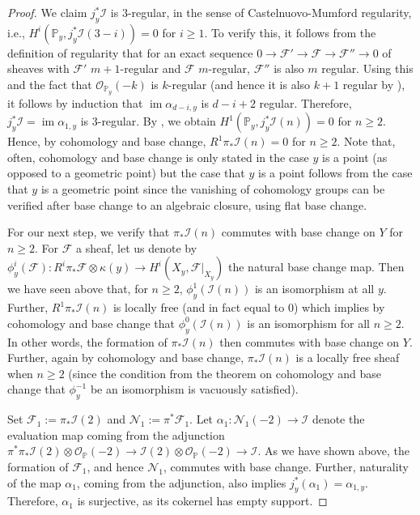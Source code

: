 \documentclass[12 pt]{amsart}
\newcommand{\rboxed}[1]{#1}
\theoremstyle{plain}
\theoremstyle{definition}
\theoremstyle{remark}
\numberwithin{equation}{section}
\newcommand\bp{\mathbb P}
\newcommand\scf{\mathscr F}
\newcommand\sci{\mathscr I}
\newcommand\scn{\mathscr N}
\newcommand\sco{\mathscr O}
\newcommand \ra{\rightarrow}
\DeclareMathOperator\im{im}
\begin{document}
\begin{proof}
	We claim
			$j_y^* \sci$ is $3$-regular, in the sense of
			Castelnuovo-Mumford regularity, i.e., $H^i( \bp_y, j_y^*
			\sci(3-i)) = 0$ for $i \geq 1$.  To verify this, it
			follows from the definition of regularity that for an
			exact sequence $0 \ra \scf' \ra \scf \ra \scf'' \ra 0$
			of sheaves with $\scf'$ $m+1$-regular and $\scf$
			$m$-regular, $\scf''$ is also $m$ regular.  Using this
			and the fact that $\sco_{\bp_y}(-k)$ is $k$-regular (and
			hence it is also $k+1$ regular by \cite[Lem.\
		5.1(b)]{FantechiGIK:fundamentalAlgebraicGeometry}), it follows
		by induction that $\im \alpha_{d-i,y}$ is $d-i+2$ regular.
		Therefore, $j^*_y \sci= \im \alpha_{1,y}$ is $3$-regular.  By
		\cite[Lem.\ 5.1(b)]{FantechiGIK:fundamentalAlgebraicGeometry},
		we obtain $H^1(\bp_y, j_y^* \sci(n)) = 0$ for $n \geq 2$.
		Hence, by cohomology and base change, $R^1 \pi_* \sci(n) = 0$
		for $n \geq 2$. Note that, often, cohomology and base change is
		only stated in the case $y$ is a point (as opposed to a
		geometric point) but the case that $y$ is a point follows from
		the case that $y$ is a geometric point since the vanishing of
		cohomology groups can be verified after base change to an
		algebraic closure, using flat base change.

	For our next step, we verify that $\pi_* \mathscr I(n)$ commutes with base
	change on $Y$ for $n \geq 2$.
	For $\scf$ a sheaf, let us denote by $\rboxed{\phi^i_y(\scf)} : R^i
	\pi_* \scf \otimes \kappa(y) \ra H^i(X_y, \scf|_{X_y})$ the natural base
	change map.  Then we have
	seen above that, for $n \geq 2$, $\phi^1_y(\sci(n))$ is an isomorphism
	at all $y$. Further, $R^1 \pi_* \sci(n)$ is locally free (and in fact
	equal to $0$) which implies by cohomology and base change that
	$\phi^0_y(\sci(n))$ is an isomorphism for all $n \geq 2$.  In other
	words, the formation of $\pi_* \sci(n)$ then commutes with base change
	on $Y$.  Further, again by cohomology and base change, $\pi_* \sci(n)$
	is a locally free sheaf when $n \geq 2$ (since the condition from the
		theorem on cohomology and base change that
	$\phi^{-1}_y$ be an isomorphism is vacuously satisfied).
			
	Set $\rboxed{\scf_1} := \pi_* \sci(2)$ and $\scn_1 := \pi^* \scf_1$.
	Let $\rboxed{\alpha_1} : \scn_1(-2) \ra \sci$ denote the evaluation map
	coming from the adjunction $\pi^* \pi_* \sci(2) \otimes \sco_\bp(-2) \ra
	\sci(2) \otimes \sco_{\bp}(-2) \ra \sci$.  As we have shown above, the
	formation of $\scf_1$, and hence $\scn_1$, commutes with base change.
	Further, naturality of the map $\alpha_1$, coming from the adjunction,
	also implies $j_y^*(\alpha_1) = \alpha_{1,y}$.  Therefore, $\alpha_1$ is
	surjective, as its cokernel has empty support.


\end{proof}
\end{document}
